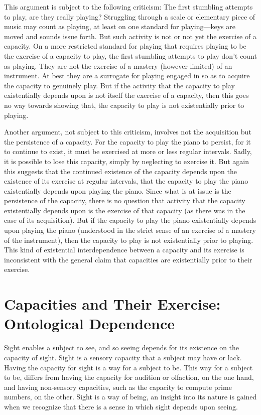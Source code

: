 \documentclass[12pt]{article}
\begin{document}
This argument is subject to the following criticism: The first stumbling attempts to play, are they really playing? Struggling through a scale or elementary piece of music may count as playing, at least on one standard for playing---keys are moved and sounds issue forth. But such activity is not or not yet the exercise of a capacity. On a more restricted standard for playing that requires playing to be the exercise of a capacity to play, the first stumbling attempts to play don't count as playing. They are not the exercise of a mastery (however limited) of an instrument. At best they are a surrogate for playing engaged in so as to acquire the capacity to genuinely play. But if the activity that the capacity to play existentially depends upon is not itself the exercise of a capacity, then this goes no way towards showing that, the capacity to play is not existentially prior to playing.

Another argument, not subject to this criticism, involves not the acquisition but the persistence of a capacity. For the capacity to play the piano to persist, for it to continue to exist, it must be exercised at more or less regular intervals. Sadly, it is possible to lose this capacity, simply by neglecting to exercise it. But again this suggests that the continued existence of the capacity depends upon the existence of its exercise at regular intervals, that the capacity to play the piano existentially depends upon playing the piano. Since what is at issue is the persistence of the capacity, there is no question that activity that the capacity existentially depends upon is the exercise of that capacity (as there was in the case of its acquisition). But if the capacity to play the piano existentially depends upon playing the piano (understood in the strict sense of an exercise of a mastery of the instrument), then the capacity to play is not existentially prior to playing. This kind of existential interdependence between a capacity and its exercise is inconsistent with the general claim that capacities are existentially prior to their exercise.

\section{Capacities and Their Exercise: Ontological Dependence} %
\label{sec:capacities_and_their_exercise_ontological_dependence}

Sight enables a subject to see, and so seeing depends for its existence on the capacity of sight. Sight is a sensory capacity that a subject may have or lack. Having the capacity for sight is a way for a subject to be. This way for a subject to be, differs from having the capacity for audition or olfaction, on the one hand, and having non-sensory capacities, such as the capacity to compute prime numbers, on the other. Sight is a way of being, an insight into its nature is gained when we recognize that there is a sense in which sight depends upon seeing.
\end{document}
